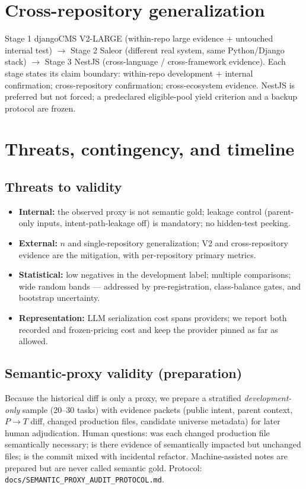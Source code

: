 \documentclass[11pt,a4paper]{article}
\begin{document}
\section{Cross-repository generalization}
\label{sec:gen}

Stage 1 djangoCMS V2-LARGE (within-repo large evidence + untouched internal
test) $\to$ Stage 2 Saleor (different real system, same Python/Django stack)
$\to$ Stage 3 NestJS (cross-language / cross-framework evidence). Each stage
states its claim boundary: within-repo development + internal confirmation;
cross-repository confirmation; cross-ecosystem evidence. NestJS is preferred
but not forced; a predeclared eligible-pool yield criterion and a backup
protocol are frozen.

\section{Threats, contingency, and timeline}
\label{sec:threats}

\subsection{Threats to validity}
\begin{itemize}
  \item \textbf{Internal:} the observed proxy is not semantic gold; leakage
        control (parent-only inputs, intent-path-leakage off) is mandatory; no
        hidden-test peeking.
  \item \textbf{External:} $n$ and single-repository generalization; V2 and
        cross-repository evidence are the mitigation, with per-repository
        primary metrics.
  \item \textbf{Statistical:} low negatives in the development label;
        multiple comparisons; wide random bands --- addressed by
        pre-registration, class-balance gates, and bootstrap uncertainty.
  \item \textbf{Representation:} LLM serialization cost spans providers; we
        report both recorded and frozen-pricing cost and keep the provider
        pinned as far as allowed.
\end{itemize}

\subsection{Semantic-proxy validity (preparation)}
\label{sec:semantic}
Because the historical diff is only a proxy, we prepare a stratified
\emph{development-only} sample (20--30 tasks) with evidence packets (public
intent, parent context, $P\!\to\!T$ diff, changed production files, candidate
universe metadata) for later human adjudication. Human questions: was each
changed production file semantically necessary; is there evidence of
semantically impacted but unchanged files; is the commit mixed with incidental
refactor. Machine-assisted notes are prepared but are never called semantic
gold. Protocol: \texttt{docs/SEMANTIC\_PROXY\_AUDIT\_PROTOCOL.md}.
\end{document}
